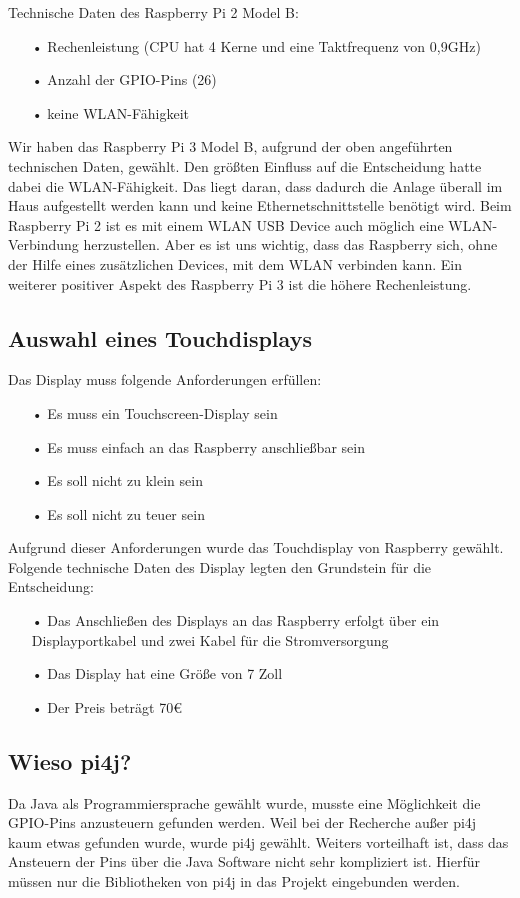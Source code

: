 Technische Daten des Raspberry Pi 2 Model B:
\begin{itemize}
\item[•] Rechenleistung (CPU hat 4 Kerne und eine Taktfrequenz von 0,9GHz)
\item[•] Anzahl der \ac{GPIO}-Pins (26)
\item[•] keine \ac{WLAN}-Fähigkeit
\end{itemize}

Wir haben das Raspberry Pi 3 Model B, aufgrund der oben angeführten technischen Daten, gewählt. Den größten Einfluss auf die Entscheidung hatte dabei die \ac{WLAN}-Fähigkeit. Das liegt daran, dass dadurch die Anlage überall im Haus aufgestellt werden kann und keine Ethernetschnittstelle benötigt wird. Beim Raspberry Pi 2 ist es mit einem WLAN USB Device auch möglich eine WLAN-Verbindung herzustellen. Aber es ist uns wichtig, dass das Raspberry sich, ohne der Hilfe eines zusätzlichen Devices, mit dem WLAN verbinden kann. Ein weiterer positiver Aspekt des Raspberry Pi 3 ist die höhere Rechenleistung.

\subsection{Auswahl eines Touchdisplays}
Das Display muss folgende Anforderungen erfüllen:
\begin{itemize}
\item[•] Es muss ein Touchscreen-Display sein
\item[•] Es muss einfach an das Raspberry anschließbar sein
\item[•] Es soll nicht zu klein sein
\item[•] Es soll nicht zu teuer sein
\end{itemize}

Aufgrund dieser Anforderungen wurde das Touchdisplay von Raspberry gewählt.
\\ Folgende technische Daten des Display legten den Grundstein für die Entscheidung:
\begin{itemize}
\item[•] Das Anschließen des Displays an das Raspberry erfolgt über ein Displayportkabel und zwei Kabel für die Stromversorgung
\item[•] Das Display hat eine Größe von 7 Zoll
\item[•] Der Preis beträgt 70\euro{}
\end{itemize}

\subsection{Wieso pi4j?}
Da Java als Programmiersprache gewählt wurde, musste eine Möglichkeit die \ac{GPIO}-Pins anzusteuern gefunden werden.
Weil bei der Recherche außer \ac{pi4j} kaum etwas gefunden wurde, wurde \ac{pi4j} gewählt. Weiters vorteilhaft ist, dass das Ansteuern der Pins über die Java Software nicht sehr kompliziert ist. Hierfür müssen nur die Bibliotheken von \ac{pi4j} in das Projekt eingebunden werden.

